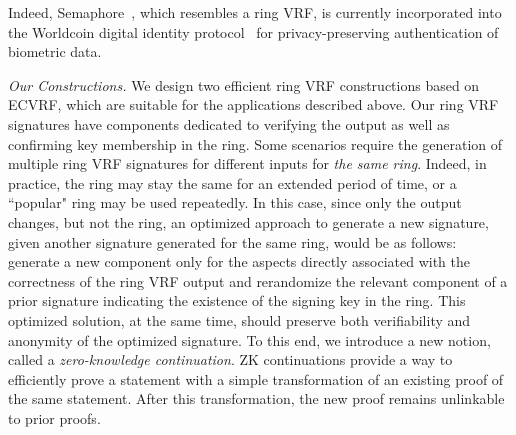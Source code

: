 Indeed, Semaphore~\cite{Semaphore}, which resembles a ring VRF, is currently incorporated into the Worldcoin digital identity protocol~\cite{Worldcoin} for privacy-preserving authentication of biometric data.

\smallskip
\emph{Our Constructions.}
 We design two efficient ring VRF constructions based on ECVRF, which are suitable for the applications described above.
Our ring VRF signatures have components dedicated to verifying the output as well as confirming key membership in the ring. Some scenarios require the generation of multiple ring VRF signatures for different inputs for \emph{the same ring}.
Indeed, in practice, the ring may stay the same for an extended period of time, or a ``popular" ring may be used repeatedly.
In this case, since only the output changes, but not the ring, an optimized approach to generate a new signature, given another signature generated for the same ring, would be as follows:  generate a new component only for the aspects directly associated with the correctness of the ring VRF output and  rerandomize the relevant component of a prior signature indicating the existence of the signing key in the ring. This optimized solution, at the same time, should preserve both verifiability and anonymity of the optimized signature.
To this end, we introduce a  new notion, called  a \emph{zero-knowledge continuation}. ZK continuations provide a way to efficiently prove a statement with a simple transformation of an existing proof of the same statement. After this transformation, the new proof remains unlinkable to prior proofs. 

